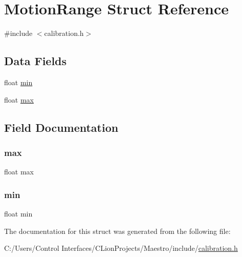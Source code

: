 \hypertarget{struct_motion_range}{}\section{Motion\+Range Struct Reference}
\label{struct_motion_range}


{\ttfamily \#include $<$calibration.\+h$>$}

\subsection*{Data Fields}
\begin{DoxyCompactItemize}
\item 
float \hyperlink{struct_motion_range_ad2e88d75f808e6d4e78d48bceb10c336}{min}
\item 
float \hyperlink{struct_motion_range_a306b5ca364bf842a8ff5bbfc0b4d4a4b}{max}
\end{DoxyCompactItemize}


\subsection{Field Documentation}
\mbox{\label{struct_motion_range_a306b5ca364bf842a8ff5bbfc0b4d4a4b}} 
\subsubsection{\texorpdfstring{max}{max}}
{\footnotesize\ttfamily float max}

\mbox{\label{struct_motion_range_ad2e88d75f808e6d4e78d48bceb10c336}} 
\subsubsection{\texorpdfstring{min}{min}}
{\footnotesize\ttfamily float min}



The documentation for this struct was generated from the following file\+:\begin{DoxyCompactItemize}
\item 
C\+:/\+Users/\+Control Interfaces/\+C\+Lion\+Projects/\+Maestro/include/\hyperlink{calibration_8h}{calibration.\+h}\end{DoxyCompactItemize}
